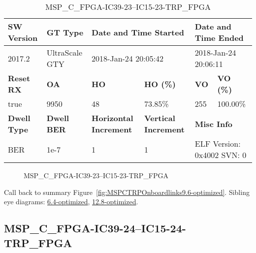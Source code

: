 \begin{table}[h]
\centering
\caption{MSP\_C\_FPGA-IC39-23--IC15-23-TRP\_FPGA}
\label{tab:MSPCFPGAIC3923IC1523TRPFPGA9.6-optimized}
\begin{tabular}{@{}|l|l|l|l|l|l|@{}}
\toprule
\textbf{SW Version}                & \textbf{GT Type}   & \multicolumn{2}{l|}{\textbf{Date and Time Started}}            & \multicolumn{2}{l|}{\textbf{Date and Time Ended}}        \\ \midrule
2017.2                       & UltraScale GTY          & \multicolumn{2}{l|}{2018-Jan-24 20:05:42}                   & \multicolumn{2}{l|}{2018-Jan-24 20:06:11}               \\ \midrule
\textbf{Reset RX}                  & \textbf{OA} & \textbf{HO}   & \textbf{HO (\%)} & \textbf{VO} & \textbf{VO (\%)} \\ \midrule
true & 9950        & 48          & 73.85\%        & 255        & 100.00\%       \\ \midrule
\textbf{Dwell Type}                & \textbf{Dwell BER} & \textbf{Horizontal Increment} & \textbf{Vertical Increment}    & \multicolumn{2}{l|}{\textbf{Misc Info}}                  \\ \midrule
BER                            & 1e-7        & 1        & 1           & \multicolumn{2}{l|}{ELF Version: 0x4002 SVN: 0}                         \\ \bottomrule
\end{tabular}
\end{table}

\begin{figure}[h]
\caption{MSP\_C\_FPGA-IC39-23--IC15-23-TRP\_FPGA} \label{fig:MSPCFPGAIC3923IC1523TRPFPGA9.6-optimized}
\end{figure}

Call back to summary Figure~\ref{fig:MSPCTRPOnboardlinks9.6-optimized}.
Sibling eye diagrams: \hyperref[sec:MSPCFPGAIC3923IC1523TRPFPGA6.4-optimized]{6.4-optimized}, \hyperref[sec:MSPCFPGAIC3923IC1523TRPFPGA12.8-optimized]{12.8-optimized}.

\clearpage
\newpage


\subsection{MSP\_C\_FPGA-IC39-24--IC15-24-TRP\_FPGA}\label{sec:MSPCFPGAIC3924IC1524TRPFPGA9.6-optimized}

